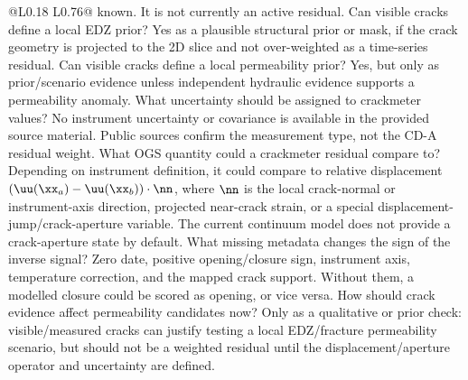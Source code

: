 \begin{longtable}{@{}L{0.18\textwidth} L{0.76\textwidth}@{}}
{known.  It is not currently an active residual.}
{ Can visible cracks define a local EDZ prior?}
{Yes as a plausible structural prior or mask, if the crack geometry is projected to
the 2D slice and not over-weighted as a time-series residual.}
{ Can visible cracks define a local permeability prior?}
{Yes, but only as prior/scenario evidence unless independent hydraulic evidence
supports a permeability anomaly.}
{ What uncertainty should be assigned to crackmeter values?}
{No instrument uncertainty or covariance is available in the provided source material.  Public sources
confirm the measurement type, not the CD-A residual weight.}
{ What OGS quantity could a crackmeter residual compare to?}
{Depending on instrument definition, it could compare to relative displacement
\((\uu(\xx_a)-\uu(\xx_b))\cdot\nn\), where \(\nn\) is the local crack-normal or
instrument-axis direction, projected near-crack strain, or a special
displacement-jump/crack-aperture variable.  The current continuum model does not
provide a crack-aperture state by default.}
{ What missing metadata changes the sign of the inverse signal?}
{Zero date, positive opening/closure sign, instrument axis, temperature correction,
and the mapped crack support.  Without them, a modelled closure could be scored as
opening, or vice versa.}
{ How should crack evidence affect permeability candidates now?}
{Only as a qualitative or prior check: visible/measured cracks can justify testing a
local EDZ/fracture permeability scenario, but should not be a weighted residual until
the displacement/aperture operator and uncertainty are defined.}
\bottomrule
\end{longtable}

